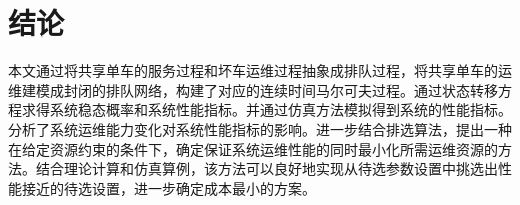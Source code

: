 \documentclass{article}
\begin{document}
\section{结论}
本文通过将共享单车的服务过程和坏车运维过程抽象成排队过程，将共享单车的运维建模成封闭的排队网络，构建了对应的连续时间马尔可夫过程。通过状态转移方程求得系统稳态概率和系统性能指标。并通过仿真方法模拟得到系统的性能指标。分析了系统运维能力变化对系统性能指标的影响。进一步结合排选算法，提出一种在给定资源约束的条件下，确定保证系统运维性能的同时最小化所需运维资源的方法。结合理论计算和仿真算例，该方法可以良好地实现从待选参数设置中挑选出性能接近的待选设置，进一步确定成本最小的方案。

\newpage




\end{document}
